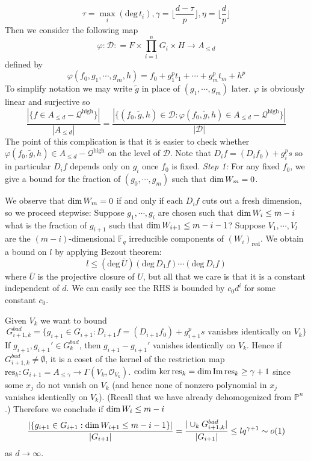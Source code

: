 \documentclass[12pt]{article}
\theoremstyle{plain}
\theoremstyle{definition}
\newcommand{\IF}{\mathbb{F}}
\newcommand{\IP}{\mathbb{P}}
\newcommand{\sD}{\mathcal{D}}
\newcommand{\sO}{\mathcal{O}}
\renewcommand{\deg}{\mathrm{deg}\,}
\renewcommand\dim{{\rm dim\,}}
\newcommand{\codim}{{\rm codim\,}}
\newcommand{\im}{{\rm Im\,}}
\newcommand{\<}{\langle}
\renewcommand{\>}{\rangle}
\def\wt{\widetilde}
\newcommand{\Qhigh}{\mathcal{Q}^\mathrm{high}}
\newcommand{\res}{\mathrm{res}}
\begin{document}
$$ \tau = \max_i(\deg t_i), \gamma = \lfloor \frac{d - \tau}{p} \rfloor, \eta = \lfloor \frac{d}{p} \rfloor $$
Then we consider the following map 
$$ \varphi : \sD : = F \times \prod_{i=1}^n G_i \times H \to A_{\le d} $$ defined by
$$\varphi(f_0, g_1, \cdots, g_m, h) = f_0 + g_1^p t_1 + \cdots + g_m^p t_m + h^p$$
To simplify notation we may write $\wt{g}$ in place of $(g_1, \cdots, g_m)$ later. $\varphi$ is obviously linear and surjective so 
$$ \frac{|\{f \in A_{\le d} - \Qhigh\}|}{|A_{\le d}|} = \frac{|\{(f_0,\wt{g}, h) \in \sD : \varphi(f_0,\wt{g}, h) \in A_{\le d} - \Qhigh \}|}{| \sD |}$$
The point of this complication is that it is easier to check whether $\varphi(f_0, \wt{g}, h) \in A_{\le d} - \Qhigh$ on the level of $\sD$. Note that $D_i f = (D_i f_0) + g_i^p s$ so in particular $D_i f$ depends only on $g_i$ once $f_0$ is fixed. 
\textit{Step 1:} For any fixed $f_0$, we give a bound for the fraction of $(g_0, \cdots, g_m)$ such that $\dim W_m = 0$.
\par We observe that $\dim W_m = 0$ if and only if each $D_i f$ cuts out a fresh dimension, so we proceed stepwise: Suppose $g_1, \cdots, g_i$ are chosen such that $\dim W_i \le m - i$ what is the fraction of $g_{i+1}$ such that $\dim W_{i+1} \le m - i - 1$? Suppose $V_1, \cdots, V_l$ are the $(m-i)$-dimensional $\IF_q$ irreducible components of $(W_i)_\mathrm{red}$. We obtain a bound on $l$ by applying Bezout theorem: 
$$l \le (\deg \overline{U})(\deg D_1 f) \cdots (\deg D_i f)$$
where $\overline{U}$ is the projective closure of $U$, but all that we care is that it is a constant independent of $d$. We can easily see the RHS is bounded by $c_0 d^i$ for some constant $c_0$.

Given $V_k$ we want to bound
$$ G_{i+1, k}^{bad} = \{ g_{i+1} \in G_{i+1} : D_{i+1} f = (D_{i+1} f_0) + g_{i+1}^p s \text{ vanishes identically on $V_k$} \} $$
If $g_{i+1}, g_{i+1}' \in G_k^{bad}$, then $g_{i+1} - g_{i+1}'$ vanishes identically on $V_k$. Hence if $G_{i+1, k}^{bad} \neq \emptyset$, it is a coset of the kernel of the restriction map $\res_k : G_{i+1} = A_{\le \gamma} \to \Gamma(V_k, \sO_{V_k})$. $\codim \ker \res_k = \dim \im \res_k \ge \gamma + 1$ since some $x_j$ do not vanish on $V_k$ (and hence none of nonzero polynomial in $x_j$ vanishes identically on $V_k$). (Recall that we have already dehomogenized from $\IP^n$.) Therefore we conclude if $\dim W_i \le m - i$
$$\frac{|\{g_{i+1} \in G_{i+1} : \dim W_{i+1} \le m - i - 1 \}|}{|G_{i+1}|} = \frac{|\cup_k G_{i+1, k}^{bad}|}{|G_{i+1}|} \le l q^{\gamma + 1} \sim o(1)$$ as $d \to \infty$. 
\end{document}
